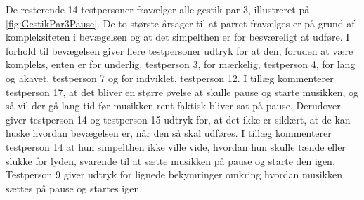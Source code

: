\noindent
% 
De resterende 14 testpersoner fravælger alle gestik-par 3, illustreret på \autoref{fig:GestikPar3Pause}. De to største årsager til at parret fravælges er på grund af kompleksiteten i bevægelsen og at det simpelthen er for besværeligt at udføre. I forhold til bevægelsen giver flere testpersoner udtryk for at den, foruden at være kompleks, enten er for underlig, testperson 3, for mærkelig, testperson 4, for lang og akavet, testperson 7 og for indviklet, testperson 12. I tillæg kommenterer testperson 17, at det bliver en større øvelse at skulle pause og starte musikken, og så vil der gå lang tid før musikken rent faktisk bliver sat på pause. Derudover giver testperson 14 og testperson 15 udtryk for, at det ikke er sikkert, at de kan huske hvordan bevægelsen er, når den så skal udføres. I tillæg kommenterer testperson 14 at hun simpelthen ikke ville vide, hvordan hun skulle tænde eller slukke for lyden, svarende til at sætte musikken på pause og starte den igen. Testperson 9 giver udtryk for lignede bekymringer omkring hvordan musikken sættes på pause og startes igen.

